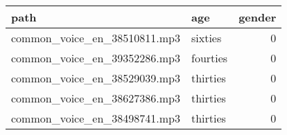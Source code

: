\begin{tabular}{llr}
\toprule
path & age & gender \\
\midrule
common\_voice\_en\_38510811.mp3 & sixties & 0 \\
common\_voice\_en\_39352286.mp3 & fourties & 0 \\
common\_voice\_en\_38529039.mp3 & thirties & 0 \\
common\_voice\_en\_38627386.mp3 & thirties & 0 \\
common\_voice\_en\_38498741.mp3 & thirties & 0 \\
\bottomrule
\end{tabular}
